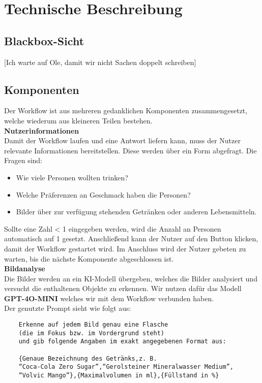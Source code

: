 \section{Technische Beschreibung}\label{sec:descr} %

\subsection{Blackbox-Sicht}\label{sec:descr:blackbox}
[Ich warte auf Ole, damit wir nicht Sachen doppelt schreiben]

\subsection{Komponenten}\label{sec:descr:components}

Der Workflow ist aus mehreren gedanklichen Komponenten zusammengesetzt, welche wiederum aus kleineren Teilen bestehen. \\

\textbf{Nutzerinformationen} \\
Damit der Workflow laufen und eine Antwort liefern kann, muss der Nutzer relevante Informationen bereitstellen.
Diese werden über ein Form abgefragt. Die Fragen sind:
\begin{itemize}
    \item Wie viele Personen wollten trinken?
    \item Welche Präferenzen an Geschmack haben die Personen?
    \item Bilder über zur verfügung stehenden Getränken oder anderen Lebensmitteln.
\end{itemize}

Sollte eine Zahl < 1 eingegeben werden, wird die Anzahl an Personen automatisch auf 1 gesetzt.
Anschließend kann der Nutzer auf den Button klicken, damit der Workflow gestartet wird.
Im Anschluss wird der Nutzer gebeten zu warten, bis die nächste Komponente abgeschlossen ist. \\

\textbf{Bildanalyse} \\
Die Bilder werden an ein KI-Modell übergeben, welches die Bilder analysiert und versucht die enthaltenen Objekte zu erkennen.
Wir nutzen dafür das Modell \textbf{GPT-4O-MINI} welches wir mit dem Workflow verbunden haben. \\

Der genutzte Prompt sieht wie folgt aus:
\begin{verbatim}
    Erkenne auf jedem Bild genau eine Flasche 
    (die im Fokus bzw. im Vordergrund steht) 
    und gib folgende Angaben im exakt angegebenen Format aus:

    {Genaue Bezeichnung des Getränks,z. B. 
    “Coca-Cola Zero Sugar”,“Gerolsteiner Mineralwasser Medium”,
    “Volvic Mango”},{Maximalvolumen in ml},{Füllstand in %}
\end{verbatim}

